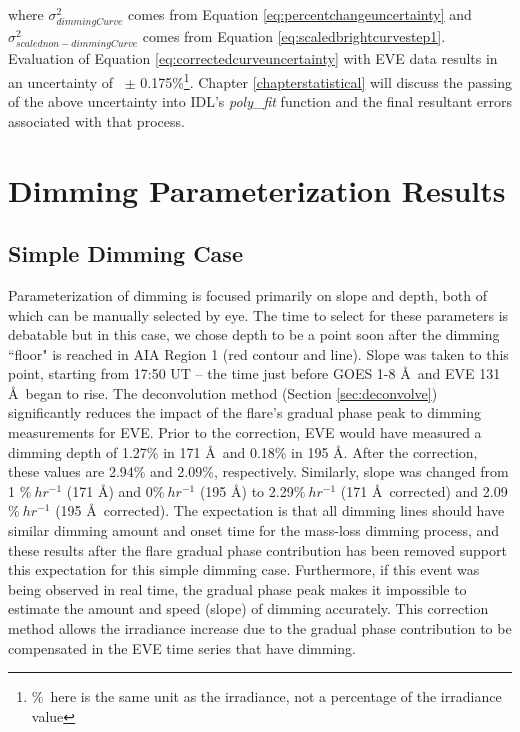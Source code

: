 \noindent where $\sigma^2_{dimmingCurve}$ comes from Equation \ref{eq:percentchangeuncertainty} and $\sigma^2_{scalednon-dimmingCurve}$ comes from Equation \ref{eq:scaledbrightcurvestep1}. Evaluation of Equation \ref{eq:correctedcurveuncertainty} with EVE data results in an uncertainty of ~$\pm$ 0.175\%\footnote{\%\ here is the same unit as the irradiance, not a percentage of the irradiance value}. Chapter \ref{chapterstatistical} will discuss the passing of the above uncertainty into IDL's \textit{poly{\_}fit} function and the final resultant errors associated with that process. 

\section{Dimming Parameterization Results}
\label{sec:casestudyresults}

\subsection{Simple Dimming Case}
Parameterization of dimming is focused primarily on slope and depth, both of which can be manually selected by eye. The time to select for these parameters is debatable but in this case, we chose depth to be a point soon after the dimming ``floor" is reached in AIA Region 1 (red contour and line). Slope was taken to this point, starting from 17:50 UT -- the time just before GOES 1-8 \AA\ and EVE 131 \AA\ began to rise. The deconvolution method (Section \ref{sec:deconvolve}) significantly reduces the impact of the flare’s gradual phase peak to dimming measurements for EVE. Prior to the correction, EVE would have measured a dimming depth of 1.27\% in 171 \AA\ and 0.18\% in 195 \AA. After the correction, these values are 2.94\% and 2.09\%, respectively. Similarly, slope was changed from 1 $\%\ hr^{-1}$ (171 \AA) and 0$\%\ hr^{-1}$ (195 Å) to 2.29$\%\ hr^{-1}$ (171 \AA\ corrected) and 2.09$\%\ hr^{-1}$ (195 \AA\ corrected). The expectation is that all dimming lines should have similar dimming amount and onset time for the mass-loss dimming process, and these results after the flare gradual phase contribution has been removed support this expectation for this simple dimming case. Furthermore, if this event was being observed in real time, the gradual phase peak makes it impossible to estimate the amount and speed (slope) of dimming accurately. This correction method allows the irradiance increase due to the gradual phase contribution to be compensated in the EVE time series that have dimming.

